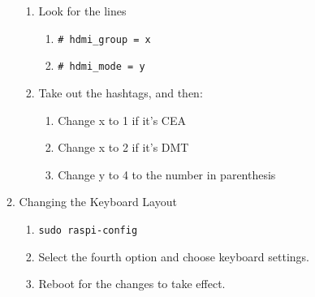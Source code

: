 \begin{enumerate}
\begin{enumerate}[label*=\arabic*.]
\begin{enumerate}[label*=\arabic*.]
                    \item Look for the lines 
                    
                        \begin{enumerate}[label*=\arabic*.]
                        \item \texttt{\# hdmi\_group = x} 
                        \item \texttt{\# hdmi\_mode = y}
                        \end{enumerate}
                    
                    \item Take out the hashtags, and then:
                    
                        \begin{enumerate}[label*=\arabic*.]
                        \item Change x to 1 if it's CEA
                        \item Change x to 2 if it's DMT
                        \item Change y to 4 to the number in parenthesis
                        \end{enumerate}
                
                \end{enumerate}
            
            \item Changing the Keyboard Layout
                \begin{enumerate}[label*=\arabic*.]
                    \item \texttt{sudo raspi-config}
                    \item Select the fourth option and choose keyboard settings.
                    \item Reboot for the changes to take effect.
                \end{enumerate}
        \end{enumerate}


\end{enumerate}
